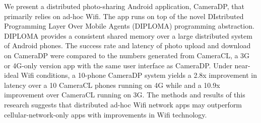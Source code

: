 We present a distributed photo-sharing Android application, CameraDP, that primarily relies on ad-hoc Wifi. The app runs on top of the novel DIstributed Programming Layer Over Mobile Agents (DIPLOMA) programming abstraction. DIPLOMA provides a consistent shared memory over a large distributed system of Android phones. The success rate and latency of photo upload and download on CameraDP were compared to the numbers generated from CameraCL, a 3G or 4G-only version app with the same user interface as CameraDP. Under near-ideal Wifi conditions, a 10-phone CameraDP system yields a 2.8x improvement in latency over a 10 CameraCL phones running on 4G while and a 10.9x improvement over CameraCL running on 3G. The methods and results of this research suggests that distributed ad-hoc Wifi network apps may outperform cellular-network-only apps with improvements in Wifi technology.

